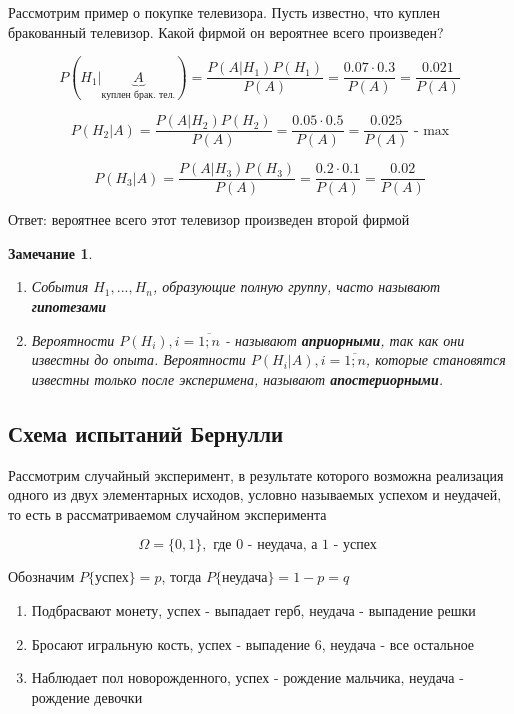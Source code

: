 \documentclass[a4paper, 14pt]{report}
\newtheorem{note}{Замечание}[section]
\begin{document}
Рассмотрим пример о покупке телевизора. Пусть известно, что куплен бракованный телевизор. Какой фирмой он вероятнее всего произведен?

$$
P(H_1| \underbrace{A}_\text{куплен брак. тел.}) = \frac{P(A|H_1)P(H_1)}{P(A)} = \frac{0.07 \cdot 0.3}{P(A)} = \frac{0.021}{P(A)}
$$

$$
P(H_2|A) = \frac{P(A|H_2)P(H_2)}{P(A)} = \frac{0.05 \cdot 0.5}{P(A)} = \frac{0.025}{P(A)} \text{ - max}
$$

$$
P(H_3|A) = \frac{P(A|H_3)P(H_3)}{P(A)} = \frac{0.2 \cdot 0.1}{P(A)} = \frac{0.02}{P(A)}
$$

Ответ: вероятнее всего этот телевизор произведен второй фирмой

\begin{note}
    \begin{enumerate}
        \item События $H_1,...,H_n$, образующие полную группу, часто называют \textbf{гипотезами}
        \item Вероятности $P(H_i), i = \overline{1;n}$ - называют \textbf{априорными}, так как они известны до опыта. Вероятности $P(H_i|A), i = \overline{1;n}$, которые становятся известны только после эксперимена, называют \textbf{апостериорными}.
    \end{enumerate}
\end{note}

\subsection{Схема испытаний Бернулли}

Рассмотрим случайный эксперимент, в результате которого возможна реализация одного из двух элементарных исходов, условно называемых успехом и неудачей, то есть в рассматриваемом случайном эксперимента

$$
\Omega = \{ 0,1 \}, \text{ где 0 - неудача, а 1 - успех }
$$

Обозначим $P\{\text{успех}\} = p$, тогда $P\{\text{неудача}\} = 1 - p = q$

\begin{enumerate}
    \item Подбрасвают монету, успех - выпадает герб, неудача - выпадение решки
    \item Бросают игральную кость, успех - выпадение 6, неудача - все остальное
    \item Наблюдает пол новорожденного, успех - рождение мальчика, неудача - рождение девочки
\end{enumerate}
\end{document}
